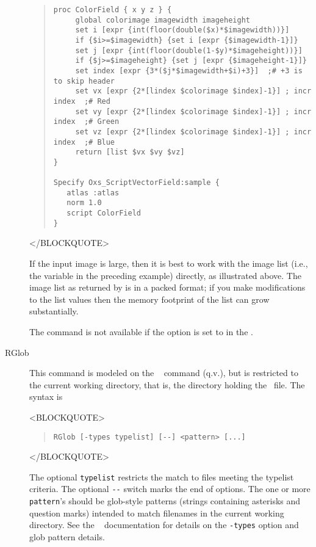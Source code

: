 \begin{description}
\begin{quote}
\begin{verbatim}
proc ColorField { x y z } {
     global colorimage imagewidth imageheight
     set i [expr {int(floor(double($x)*$imagewidth))}]
     if {$i>=$imagewidth} {set i [expr {$imagewidth-1}]}
     set j [expr {int(floor(double(1-$y)*$imageheight))}]
     if {$j>=$imageheight} {set j [expr {$imageheight-1}]}
     set index [expr {3*($j*$imagewidth+$i)+3}]  ;# +3 is to skip header
     set vx [expr {2*[lindex $colorimage $index]-1}] ; incr index  ;# Red
     set vy [expr {2*[lindex $colorimage $index]-1}] ; incr index  ;# Green
     set vz [expr {2*[lindex $colorimage $index]-1}] ; incr index  ;# Blue
     return [list $vx $vy $vz]
}

Specify Oxs_ScriptVectorField:sample {
   atlas :atlas
   norm 1.0
   script ColorField
}
\end{verbatim}
\end{quote}
\begin{rawhtml}
</BLOCKQUOTE>
\end{rawhtml}
If the input image is large, then it is best to work with the image list
(i.e., the variable  in the preceding example) directly,
as illustrated above.  The image list as returned by  is in
a packed format; if you make modifications to the list values then the
memory footprint of the list can grow substantially.

The  command is not available if the 
option is set to  in the 
.

\item[RGlob]
This command is modeled on the \Tcl\  command (q.v.), but
is restricted to the current working directory, that is, the
directory holding the \MIF\ file.  The syntax is
\begin{rawhtml}
<BLOCKQUOTE>
\end{rawhtml}
\begin{quote}
\begin{verbatim}
RGlob [-types typelist] [--] <pattern> [...]
\end{verbatim}
\end{quote}
\begin{rawhtml}
</BLOCKQUOTE>
\end{rawhtml}
The optional \texttt{typelist} restricts the match to files meeting the
typelist criteria.  The optional \verb+--+ switch marks the end of
options.  The one or more \texttt{pattern}'s should be glob-style
patterns (strings containing asterisks and question marks) intended to
match filenames in the current working directory.  See the \Tcl\
 documentation for details on the \texttt{-types} option and
glob pattern details.


\end{description}
